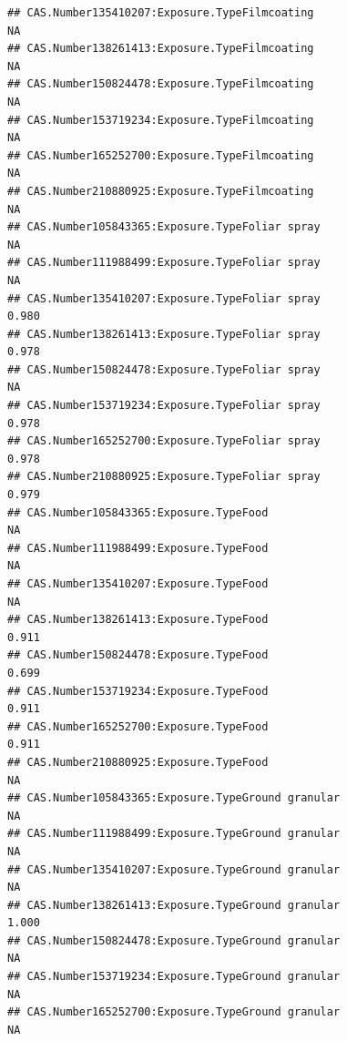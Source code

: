 \documentclass[
  12pt,
]{article}
\begin{document}
\begin{verbatim}
## CAS.Number135410207:Exposure.TypeFilmcoating                                          NA
## CAS.Number138261413:Exposure.TypeFilmcoating                                          NA
## CAS.Number150824478:Exposure.TypeFilmcoating                                          NA
## CAS.Number153719234:Exposure.TypeFilmcoating                                          NA
## CAS.Number165252700:Exposure.TypeFilmcoating                                          NA
## CAS.Number210880925:Exposure.TypeFilmcoating                                          NA
## CAS.Number105843365:Exposure.TypeFoliar spray                                         NA
## CAS.Number111988499:Exposure.TypeFoliar spray                                         NA
## CAS.Number135410207:Exposure.TypeFoliar spray                                      0.980
## CAS.Number138261413:Exposure.TypeFoliar spray                                      0.978
## CAS.Number150824478:Exposure.TypeFoliar spray                                         NA
## CAS.Number153719234:Exposure.TypeFoliar spray                                      0.978
## CAS.Number165252700:Exposure.TypeFoliar spray                                      0.978
## CAS.Number210880925:Exposure.TypeFoliar spray                                      0.979
## CAS.Number105843365:Exposure.TypeFood                                                 NA
## CAS.Number111988499:Exposure.TypeFood                                                 NA
## CAS.Number135410207:Exposure.TypeFood                                                 NA
## CAS.Number138261413:Exposure.TypeFood                                              0.911
## CAS.Number150824478:Exposure.TypeFood                                              0.699
## CAS.Number153719234:Exposure.TypeFood                                              0.911
## CAS.Number165252700:Exposure.TypeFood                                              0.911
## CAS.Number210880925:Exposure.TypeFood                                                 NA
## CAS.Number105843365:Exposure.TypeGround granular                                      NA
## CAS.Number111988499:Exposure.TypeGround granular                                      NA
## CAS.Number135410207:Exposure.TypeGround granular                                      NA
## CAS.Number138261413:Exposure.TypeGround granular                                   1.000
## CAS.Number150824478:Exposure.TypeGround granular                                      NA
## CAS.Number153719234:Exposure.TypeGround granular                                      NA
## CAS.Number165252700:Exposure.TypeGround granular                                      NA

\end{verbatim}
\end{document}
